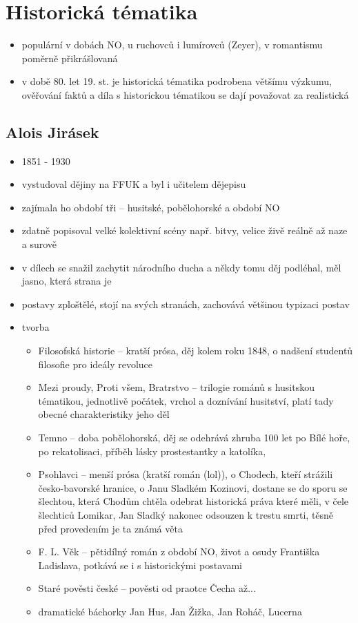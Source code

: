 \documentclass{article}
\begin{document}
\section{Historická tématika}
\begin{itemize}
  \item populární v dobách NO, u ruchovců i lumírovců (Zeyer), v romantismu poměrně přikrášlovaná
  \item v době 80. let 19. st. je historická tématika podrobena většímu výzkumu, ověřování faktů a díla s historickou tématikou se dají považovat za realistická
\end{itemize}

\subsection{Alois Jirásek}
\begin{itemize}
  \item 1851 - 1930
  \item vystudoval dějiny na FFUK a byl i učitelem dějepisu
  \item zajímala ho období tři -- husitské, pobělohorské a období NO
  \item zdatně popisoval velké kolektivní scény např. bitvy, velice živě reálně až naze a surově
  \item v dílech se snažil zachytit národního ducha a někdy tomu děj podléhal, měl jasno, která strana je 
  \item postavy zploštělé, stojí na svých stranách, zachovává většinou typizaci postav
  \item tvorba
  \begin{itemize}
    \item Filosofská historie -- kratší prósa, děj kolem roku 1848, o nadšení studentů filosofie pro ideály revoluce
    \item Mezi proudy, Proti všem, Bratrstvo -- trilogie románů s husitskou tématikou, jednotlivě počátek, vrchol a doznívání husitství, platí tady obecné charakteristiky jeho děl
    \item Temno -- doba pobělohorská, děj se odehrává zhruba 100 let po Bílé hoře, po rekatolisaci, příběh lásky prostestantky a katolíka, 
    \item Psohlavci -- menší prósa (kratší román (lol)), o Chodech, kteří strážili česko-bavorské hranice, o Janu Sladkém Kozinovi, dostane se do sporu se šlechtou, která Chodům chtěla odebrat historická práva které měli, v čele šlechticů Lomikar, Jan Sladký nakonec odsouzen k trestu smrti, těsně před provedením je ta známá věta
    \item F. L. Věk -- pětidílný román z období NO, život a osudy Františka Ladislava, potkává se i s historickými postavami
    \item Staré pověsti české -- pověsti od praotce Čecha až...
    \item dramatické báchorky Jan Hus, Jan Žižka, Jan Roháč, Lucerna
  \end{itemize}
\end{itemize}
\end{document}
